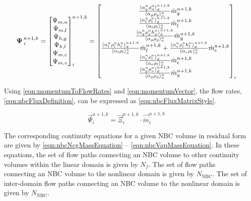 \begin{equation}
\label{eqn:nbcFluxDefinition}
\vec{\Psi}^{n+1, k}_{i} = \begin{bmatrix}
\Psi_{m, n} \\
\Psi_{m, l} \\
\Psi_{h, g} \\
\Psi_{h, l} \\
\Psi_{m, e} \\
\Psi_{m, v} \\
\end{bmatrix}^{n+1, k}_{i} = \begin{bmatrix}
\frac{\don{\alpha^{n}_{g} \rho^{n}_{n}}^{n+1,k}_{d}}{\ave{\alpha_{g} \rho_{g}}^{n}_{a}}\dot{m}^{n+1,k}_{g} \\
%
\frac{\don{\alpha^{n}_{l}\rho^{n}_{l}}^{n+1,k}_{d}}{\ave{\alpha_{l} \rho_{l}}^{n}_{a}}\dot{m}^{n+1,k}_{l}\\
%
\frac{\don{\alpha^{n}_{g} \rho^{n}_{g} h^{n}_{g}}^{n+1,k}_{d}}{\ave{\alpha_{g} \rho_{g}}^{n}_{a}}\dot{m}^{n+1, k}_{g}\\
%
\frac{\don{\alpha^{n}_{l}\rho^{n}_{l} h^{n}_{l}}^{n+1,k}_{d}}{\ave{\alpha_{l} \rho_{l}}^{n}_{a}}\dot{m}^{n+1, k}_{l} +\frac{\don{\alpha^{n}_{e} \rho^{n}_{l} h^{n}_{l}}^{n+1, k}_{d}}{\ave{\alpha_{e} \rho_{l}}^{n}_{a}}\dot{m}^{n+1, k}_{e} \\
%
\frac{ \don{\alpha^{n}_{e} \rho^{n}_{l}}^{n+1, k}_{d}}{ \ave{\alpha_{e} \rho_{l}}^{n}_{a}} \dot{m}^{n+1, k}_{e} \\
%
\frac{ \don{\alpha^{n}_{g} \rho^{n}_{v}}^{n+1, k}_{d}}{ \ave{\alpha_{g} \rho_{g}}^{n}_{a}} \dot{m}^{n+1, k}_{g}
\end{bmatrix}_{i}
\end{equation}

Using \eqref{eqn:momentumToFlowRates} and \eqref{eqn:momentumVector}, the flow rates, \eqref{eqn:nbcFluxDefinition}, can be expressed as \eqref{eqn:nbcFluxMatrixStyle}.

\begin{equation}
\label{eqn:nbcFluxMatrixStyle}
\vec{\Psi}^{n+1, k}_{i} = \vec{\Xi}^{n+1, k}_{i} \cdot \vec{\dot{m}}^{n+1, k}_{i}
\end{equation}

The corresponding continuity equations for a given NBC volume in residual form are given by \eqref{eqn:nbcNcgMassEquation} -- \eqref{eqn:nbcVapMassEquation}.
In these equations, the set of flow paths connecting an NBC volume to other continuity volumes within the linear domain is given by $N_{f}$.
The set of flow paths connecting an NBC volume to the nonlinear domain is given by $N_{\text{NBC}}$.
The set of inter-domain flow paths connecting an NBC volume to the nonlinear domain is given by $N_{\text{NBC}}$.

